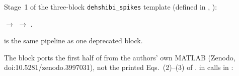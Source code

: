 Stage~1 of the three-block \texttt{dehshibi\_spikes} template (defined in
, ):
\begin{center}
 $\to$ 
$\to$ .
\end{center}
 is the same pipeline as one deprecated block.

The block ports the first half of  from the authors' own MATLAB
(Zenodo, doi:10.5281/zenodo.3997031), not the printed Eqs.~(2)--(3) of
\citet{dehshibi2021electrical}.  in 
calls  in :
